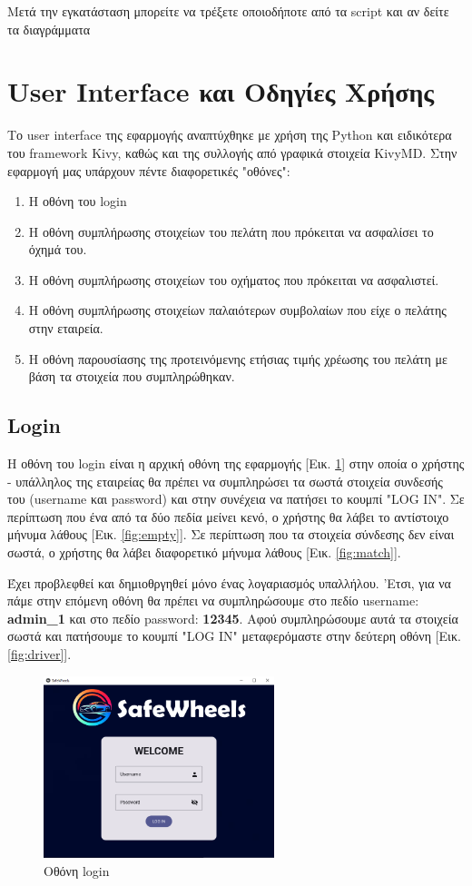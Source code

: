 \documentclass{llncs}
\begin{document}
Mετά την εγκατάσταση μπορείτε να τρέξετε οποιοδήποτε από τα script και αν δείτε τα διαγράμματα


\section{User Interface και Οδηγίες Χρήσης}
Το user interface της εφαρμογής αναπτύχθηκε με χρήση της Python και ειδικότερα του framework Kivy, καθώς και της συλλογής από γραφικά στοιχεία KivyMD. Στην εφαρμογή μας υπάρχουν πέντε διαφορετικές "οθόνες":
\begin{enumerate}
    \item Η οθόνη του login
    \item Η οθόνη συμπλήρωσης στοιχείων του πελάτη που πρόκειται να ασφαλίσει το όχημά του.
    \item Η οθόνη συμπλήρωσης στοιχείων του οχήματος που πρόκειται να ασφαλιστεί.
    \item Η οθόνη συμπλήρωσης στοιχείων παλαιότερων συμβολαίων που είχε ο πελάτης στην εταιρεία.
    \item Η οθόνη παρουσίασης της προτεινόμενης ετήσιας τιμής χρέωσης του πελάτη με βάση τα στοιχεία που συμπληρώθηκαν.
\end{enumerate}

\subsection{Login}
Η οθόνη του login είναι η αρχική οθόνη της εφαρμογής [Εικ. \ref{fig:login}] στην οποία ο χρήστης - υπάλληλος της εταιρείας θα πρέπει να συμπληρώσει τα σωστά στοιχεία συνδεσής του (username και password) και στην συνέχεια να πατήσει το κουμπί "LOG IN". Σε περίπτωση που ένα από τα δύο πεδία μείνει κενό, ο χρήστης θα λάβει το αντίστοιχο μήνυμα λάθους [Εικ. \ref{fig:empty}].
Σε περίπτωση που τα στοιχεία σύνδεσης δεν είναι σωστά, ο χρήστης θα λάβει διαφορετικό μήνυμα λάθους [Εικ. \ref{fig:match}].

Έχει προβλεφθεί και δημιοθργηθεί μόνο ένας λογαριασμός υπαλλήλου. 'Ετσι, για να πάμε στην επόμενη οθόνη θα πρέπει να συμπληρώσουμε στο πεδίο username: \textbf{admin\_1} και στο πεδίο password: \textbf{12345}. Αφού συμπληρώσουμε αυτά τα στοιχεία σωστά και πατήσουμε το κουμπί "LOG IN" μεταφερόμαστε στην δεύτερη οθόνη [Εικ. \ref{fig:driver}].
\begin{figure}
    \begin{center}
        \includegraphics[width=0.6\textwidth]{images/login.png}
    \end{center}
    \caption{Οθόνη login} 
    \label{fig:login}   
\end{figure}
\end{document}
